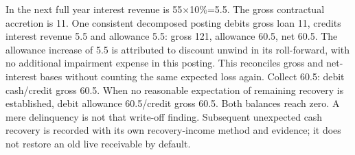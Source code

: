 In the next full year interest revenue is 55\ensuremath{\times}10\%=5.5. The gross contractual accretion is 11. One consistent decomposed posting debits gross loan 11, credits interest revenue 5.5 and allowance 5.5: gross 121, allowance 60.5, net 60.5. The allowance increase of 5.5 is attributed to discount unwind in its roll-forward, with no additional impairment expense in this posting. This reconciles gross and net-interest bases without counting the same expected loss again. Collect 60.5: debit cash/credit gross 60.5. When no reasonable expectation of remaining recovery is established, debit allowance 60.5/credit gross 60.5. Both balances reach zero. A mere delinquency is not that write-off finding. Subsequent unexpected cash recovery is recorded with its own recovery-income method and evidence; it does not restore an old live receivable by default.

